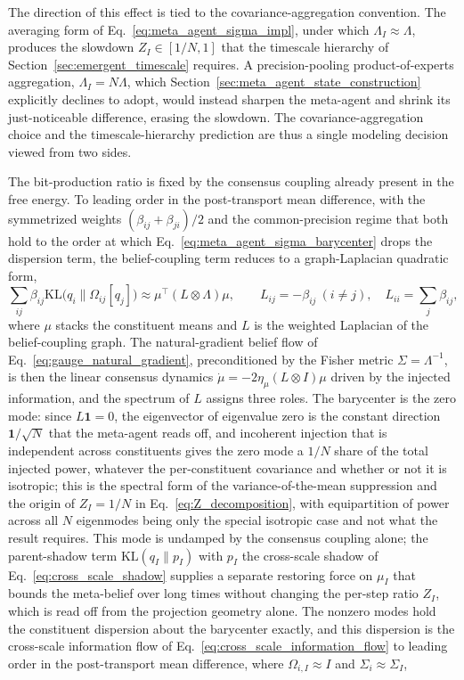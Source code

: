 \documentclass[11pt]{article}
\begin{document}
The direction of this effect is tied to the covariance-aggregation convention. The averaging form of Eq.~\eqref{eq:meta_agent_sigma_impl}, under which $\Lambda_I \approx \Lambda$, produces the slowdown $Z_I \in [1/N, 1]$ that the timescale hierarchy of Section~\ref{sec:emergent_timescale} requires. A precision-pooling product-of-experts aggregation, $\Lambda_I = N\Lambda$, which Section~\ref{sec:meta_agent_state_construction} explicitly declines to adopt, would instead sharpen the meta-agent and shrink its just-noticeable difference, erasing the slowdown. The covariance-aggregation choice and the timescale-hierarchy prediction are thus a single modeling decision viewed from two sides.

The bit-production ratio is fixed by the consensus coupling already present in the free energy. To leading order in the post-transport mean difference, with the symmetrized weights $(\beta_{ij}+\beta_{ji})/2$ and the common-precision regime that both hold to the order at which Eq.~\eqref{eq:meta_agent_sigma_barycenter} drops the dispersion term, the belief-coupling term reduces to a graph-Laplacian quadratic form,
\begin{equation}
\sum_{ij}\beta_{ij}\mathrm{KL}\big(q_i \| \Omega_{ij}[q_j]\big) \approx \mu^\top (L \otimes \Lambda)\mu,
\qquad
L_{ij} = -\beta_{ij}\ (i\neq j),\quad L_{ii} = \sum_{j}\beta_{ij},
\label{eq:coupling_laplacian}
\end{equation}
where $\mu$ stacks the constituent means and $L$ is the weighted Laplacian of the belief-coupling graph. The natural-gradient belief flow of Eq.~\eqref{eq:gauge_natural_gradient}, preconditioned by the Fisher metric $\Sigma = \Lambda^{-1}$, is then the linear consensus dynamics $\dot\mu = -2\eta_\mu (L\otimes I)\mu$ driven by the injected information, and the spectrum of $L$ assigns three roles. The barycenter is the zero mode: since $L\mathbf{1} = 0$, the eigenvector of eigenvalue zero is the constant direction $\mathbf{1}/\sqrt{N}$ that the meta-agent reads off, and incoherent injection that is independent across constituents gives the zero mode a $1/N$ share of the total injected power, whatever the per-constituent covariance and whether or not it is isotropic; this is the spectral form of the variance-of-the-mean suppression and the origin of $Z_I = 1/N$ in Eq.~\eqref{eq:Z_decomposition}, with equipartition of power across all $N$ eigenmodes being only the special isotropic case and not what the result requires. This mode is undamped by the consensus coupling alone; the parent-shadow term $\mathrm{KL}(q_I \| p_I)$ with $p_I$ the cross-scale shadow of Eq.~\eqref{eq:cross_scale_shadow} supplies a separate restoring force on $\mu_I$ that bounds the meta-belief over long times without changing the per-step ratio $Z_I$, which is read off from the projection geometry alone. The nonzero modes hold the constituent dispersion about the barycenter exactly, and this dispersion is the cross-scale information flow of Eq.~\eqref{eq:cross_scale_information_flow} to leading order in the post-transport mean difference, where $\Omega_{i,I}\approx I$ and $\Sigma_i\approx\Sigma_I$,
\end{document}
